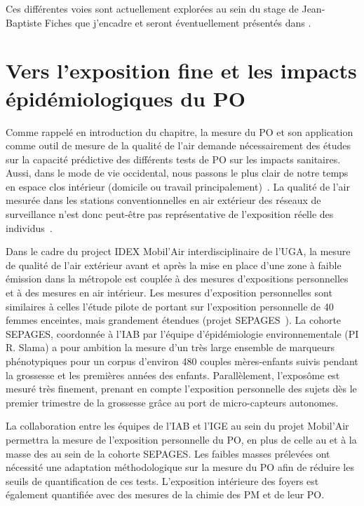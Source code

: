 Ces différentes voies sont actuellement explorées au sein du stage de Jean-Baptiste Fiches
que j'encadre et seront éventuellement présentés dans \cite{borlazaUrbaninprep.}.

\section{Vers l'exposition fine et les impacts épidémiologiques du PO}

Comme rappelé en introduction du chapitre, la mesure du PO et son application comme outil
de mesure de la qualité de l'air demande nécessairement des études sur la capacité
prédictive des différents tests de PO sur les impacts sanitaires.
Aussi, dans le mode de vie occidental, nous passons le plus clair de notre temps en espace
clos intérieur (domicile ou travail
principalement)~\autocite{netheryTime2009,ouidirEstimation2015}. La qualité de l'air
mesurée dans les stations conventionnelles en air extérieur des réseaux de surveillance
n'est donc peut-être pas représentative de l'exposition réelle des
individus~\autocite{sauvainOxidative2015}.

Dans le cadre du project IDEX Mobil'Air interdisciplinaire de l'UGA, la mesure de qualité
de l'air extérieur avant et après la mise en place d'une zone à faible émission dans la
métropole est couplée à des mesures d'expositions personnelles et à des mesures en air intérieur. Les mesures
d'exposition personnelles sont similaires à celles l'étude pilote de \cite{ouidirEstimation2015}
portant sur l'exposition personnelle de 40 femmes enceintes, mais grandement étendues (projet
SEPAGES~\autocite{lyon-caenDeciphering2019}). La cohorte SEPAGES, coordonnée à l'IAB par l'équipe d'épidémiologie environnementale (PI R. Slama) a pour ambition la mesure d'un très large
ensemble de marqueurs phénotypiques pour un corpus d'environ 480 couples mères-enfants
suivis pendant la grossesse et les premières années des enfants. Parallèlement,
l'exposôme est mesuré très finement, prenant en compte l'exposition personnelle des
sujets dès le premier trimestre de la grossesse grâce au port de micro-capteurs autonomes.

La collaboration entre les équipes de l'IAB et l'IGE au sein du projet Mobil'Air permettra la mesure de l'exposition personnelle
du PO, en plus de celle au  et à la masse des \PMdc{} au sein de la cohorte SEPAGES. Les faibles masses prélevées
ont nécessité une adaptation méthodologique sur la mesure du PO afin de réduire les
seuils de quantification de ces tests.
L'exposition intérieure des foyers est également quantifiée avec des mesures de la chimie des PM et de leur PO.

